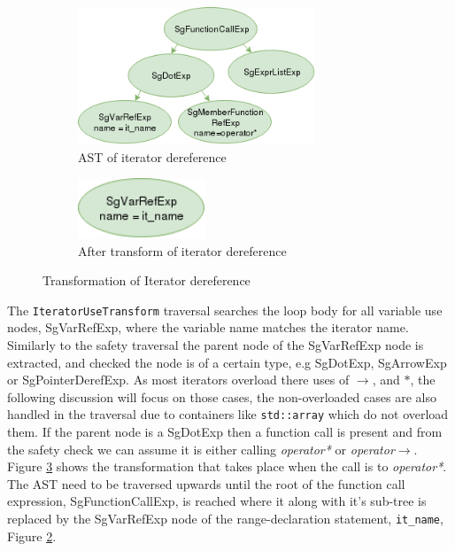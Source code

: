 \documentclass[bsc,frontabs,singlespacing,parskip,deptreport]{infthesis}
\begin{document}
\begin{figure}[H]
    \begin{subfigure}[b]{0.5\textwidth}
        \centering
            \includegraphics[height=4.1cm]{images/iterator-deref-replace-ast.png}
        \caption{AST of iterator dereference}
        \label{fig:iter-AST-Trans-deref-before}
    \end{subfigure}
    \hfill
    \begin{subfigure}[b]{0.5\textwidth}
        \centering
            \includegraphics[width=0.42\textwidth]{images/single-varRef-node.png}
        \caption{After transform of iterator dereference}
        \label{fig:iter-AST-Trans-deref-after}
    \end{subfigure}
    \vspace{-0.5cm}
    \caption{Transformation of Iterator dereference}
    \label{fig:iter-deref-use-trans}
\end{figure}

The \texttt{IteratorUseTransform} traversal searches the loop body for all variable use nodes, SgVarRefExp, where the variable name matches the iterator name. Similarly to the safety traversal the parent node of the SgVarRefExp node is extracted, and checked the node is of a certain type, e.g SgDotExp, SgArrowExp or SgPointerDerefExp. As most iterators overload there uses of $\rightarrow$, and $*$, the following discussion will focus on those cases, the non-overloaded cases are also handled in the traversal due to containers like \texttt{std::array} which do not overload them. If the parent node is a SgDotExp then a function call is present and from the safety check we can assume it is either calling \textit{operator*} or \textit{operator$\rightarrow$}. Figure \ref{fig:iter-deref-use-trans} shows the transformation that takes place when the call is to \textit{operator*}. The AST need to be traversed upwards until the root of the function call expression, SgFunctionCallExp, is reached where it along with it's sub-tree is replaced by the SgVarRefExp node of the  range-declaration statement, \texttt{it\_name}, Figure \ref{fig:iter-AST-Trans-deref-after}. 
\end{document}
